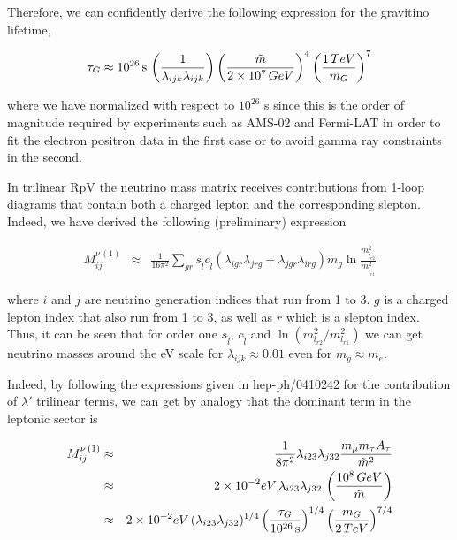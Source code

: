 \documentclass[a4paper,11pt]{article}
\begin{document}
Therefore, we can confidently derive the following expression for
the gravitino lifetime,

\begin{equation}
\tau_{G} \approx 10^{26}\,\text{s}\,\left(\frac{1}{\lambda_{ijk}\lambda_{ijk}}\right)\left(\frac{\tilde{m}}{2\times 10^{7}\mbox{\,GeV}}\right)^{4}\left(\frac{1\,\mbox{TeV}}{m_{G}}\right)^{7}\label{eq:GravLifeTime}
\end{equation}


\noindent where we have normalized with respect to $10^{26}$ s
since this is the order of magnitude required by experiments such
as AMS-02 and Fermi-LAT in order to fit the electron positron data
in the first case or to avoid gamma ray constraints in the second.



In trilinear RpV the neutrino mass matrix receives contributions from
1-loop diagrams that contain both a charged lepton and the corresponding
slepton. Indeed, we have derived the following (preliminary) expression

\begin{eqnarray*}
M_{ij}^{\nu\,(1)} & \approx & \frac{1}{16\pi^{2}}\sum_{gr}s_{\tilde{l}}c_{\tilde{l}}(\lambda_{igr}\lambda_{jrg}+\lambda_{jgr}\lambda_{irg})m_{g}\ln\frac{m_{\tilde{l}_{r2}}^{2}}{m_{\tilde{l}_{r1}}^{2}}
\end{eqnarray*}


\noindent where $i$ and $j$ are neutrino generation indices that
run from 1 to 3. $g$ is a charged lepton index that also run from
1 to 3, as well as $r$ which is a slepton index. Thus, it can be
seen that for order one $s_{\tilde{l}}$, $c_{\tilde{l}}$ and $\ln(m_{l_{r2}}^{2}/m_{l_{r1}}^{2})$
we can get neutrino masses around the eV scale for $\lambda_{ijk}\approx0.01$
even for $m_{g}\approx m_{e}$. 

Indeed, by following the expressions given in hep-ph/0410242 for the
contribution of $\lambda'$ trilinear terms, we can get by analogy
that the dominant term in the leptonic sector is 

\begin{eqnarray*}
M_{ij}^{\nu\,(1)} & \approx & \frac{1}{8\pi^{2}}\lambda_{i23}\lambda_{j32}\frac{m_{\mu}m_{\tau}A_{\tau}}{\tilde{m}^{2}}\\
 & \approx & 2\times10^{-2}\mbox{eV}\,\lambda_{i23}\lambda_{j32}\,\left(\frac{10^{8}\mbox{\,GeV}}{\tilde{m}}\right)\\
 & \approx & 2 \times10^{-2}\mbox{eV}\,(\lambda_{i23}\lambda_{j32})^{1/4}\left(\frac{\tau_{G}}{10^{\text{26}}\,\text{s}}\right)^{1/4}\left(\frac{m_{G}}{2\,\mbox{TeV}}\right)^{7/4}
\end{eqnarray*}
\end{document}
